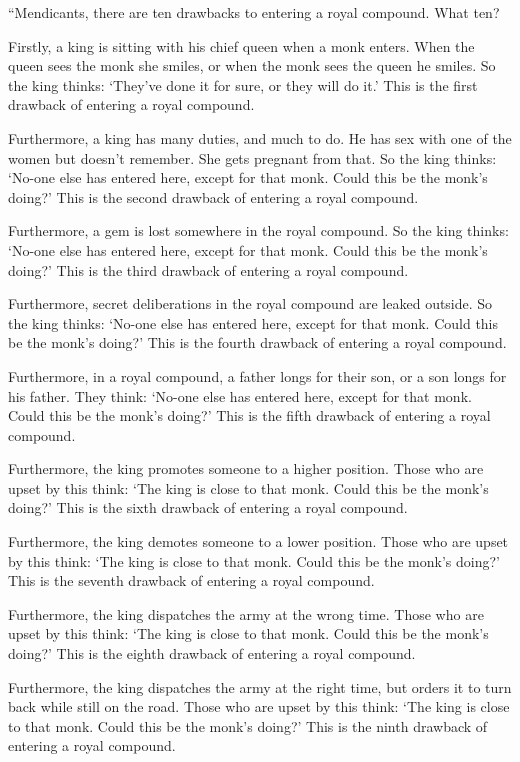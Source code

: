 \documentclass[12pt,openany]{book}%
\begin{document}
“Mendicants, there are ten drawbacks to entering a royal compound. What ten? 

Firstly, a king is sitting with his chief queen when a monk enters. When the queen sees the monk she smiles, or when the monk sees the queen he smiles. So the king thinks: ‘They’ve done it for sure, or they will do it.’ This is the first drawback of entering a royal compound. 

Furthermore, a king has many duties, and much to do. He has sex with one of the women but doesn’t remember. She gets pregnant from that. So the king thinks: ‘No-one else has entered here, except for that monk. Could this be the monk’s doing?’ This is the second drawback of entering a royal compound. 

Furthermore, a gem is lost somewhere in the royal compound. So the king thinks: ‘No-one else has entered here, except for that monk. Could this be the monk’s doing?’ This is the third drawback of entering a royal compound. 

Furthermore, secret deliberations in the royal compound are leaked outside. So the king thinks: ‘No-one else has entered here, except for that monk. Could this be the monk’s doing?’ This is the fourth drawback of entering a royal compound. 

Furthermore, in a royal compound, a father longs for their son, or a son longs for his father. They think: ‘No-one else has entered here, except for that monk. Could this be the monk’s doing?’ This is the fifth drawback of entering a royal compound. 

Furthermore, the king promotes someone to a higher position. Those who are upset by this think: ‘The king is close to that monk. Could this be the monk’s doing?’ This is the sixth drawback of entering a royal compound. 

Furthermore, the king demotes someone to a lower position. Those who are upset by this think: ‘The king is close to that monk. Could this be the monk’s doing?’ This is the seventh drawback of entering a royal compound. 

Furthermore, the king dispatches the army at the wrong time. Those who are upset by this think: ‘The king is close to that monk. Could this be the monk’s doing?’ This is the eighth drawback of entering a royal compound. 

Furthermore, the king dispatches the army at the right time, but orders it to turn back while still on the road. Those who are upset by this think: ‘The king is close to that monk. Could this be the monk’s doing?’ This is the ninth drawback of entering a royal compound. 
\end{document}
